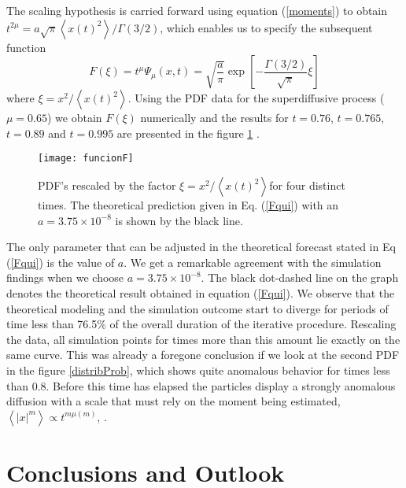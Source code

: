 \documentclass[reprint, aps, pre,nofootinbib]{revtex4-1}
\begin{document}
The scaling hypothesis is carried forward using equation (\ref{moments})
to obtain $t^{2\mu}=a\sqrt{\pi}\left\langle x(t)^{2}\right\rangle /\varGamma\left(3/2\right)$,
which enables us to specify the subsequent function
\begin{equation}
F(\xi)=t^{\mu}\Psi_{\mu}(x,t)=\sqrt{\frac{a}{\pi}}\exp\left[-\frac{\varGamma\left(3/2\right)}{\sqrt{\pi}}\xi\right]\label{Fqui}
\end{equation}
where $\xi=x^{2}/\left\langle x(t)^{2}\right\rangle $. Using the
PDF data for the superdiffusive process ($\mu=0.65$) we obtain $F(\xi)$
numerically and the results for $t=0.76$, $t=0.765$, $t=0.89$ and
$t=0.995$ are presented in the figure \ref{fig:PDF-rescaled} .
\begin{figure}
\centering{}\texttt{[image: funcionF]}\caption{PDF's rescaled by the factor $\xi=x^{2}/\left\langle x(t)^{2}\right\rangle $for
four distinct times. The theoretical prediction given in Eq. (\ref{Fqui})
with an $a=3.75\times10^{-8}$ is shown by the black line. \label{fig:PDF-rescaled}}
\end{figure}
 The only parameter that can be adjusted in the theoretical forecast
stated in Eq (\ref{Fqui}) is the value of $a$. We get a remarkable
agreement with the simulation findings when we choose $a=3.75\times10^{-8}$.
The black dot-dashed line on the graph denotes the theoretical result
obtained in equation (\ref{Fqui}). We observe that the theoretical
modeling and the simulation outcome start to diverge for periods of
time less than 76.5\% of the overall duration of the iterative procedure.
Rescaling the data, all simulation points for times more than this
amount lie exactly on the same curve. This was already a foregone
conclusion if we look at the second PDF in the figure \ref{distribProb},
which shows quite anomalous behavior for times less than 0.8. Before
this time has elapsed the particles display a strongly anomalous diffusion
with a scale that must rely on the moment being estimated, $\left\langle \left|x\right|^{m}\right\rangle \propto t^{m\mu(m)}$,
\citep{Andersen2000}. 

\section{Conclusions and Outlook}
\end{document}
